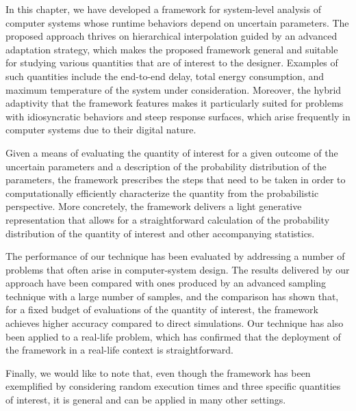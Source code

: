 In this chapter, we have developed a framework for system-level analysis of
computer systems whose runtime behaviors depend on uncertain parameters. The
proposed approach thrives on hierarchical interpolation guided by an advanced
adaptation strategy, which makes the proposed framework general and suitable for
studying various quantities that are of interest to the designer. Examples of
such quantities include the end-to-end delay, total energy consumption, and
maximum temperature of the system under consideration. Moreover, the hybrid
adaptivity that the framework features makes it particularly suited for problems
with idiosyncratic behaviors and steep response surfaces, which arise frequently
in computer systems due to their digital nature.

Given a means of evaluating the quantity of interest for a given outcome of the
uncertain parameters and a description of the probability distribution of the
parameters, the framework prescribes the steps that need to be taken in order to
computationally efficiently characterize the quantity from the probabilistic
perspective. More concretely, the framework delivers a light generative
representation that allows for a straightforward calculation of the probability
distribution of the quantity of interest and other accompanying statistics.

The performance of our technique has been evaluated by addressing a number of
problems that often arise in computer-system design. The results delivered by
our approach have been compared with ones produced by an advanced sampling
technique with a large number of samples, and the comparison has shown that, for
a fixed budget of evaluations of the quantity of interest, the framework
achieves higher accuracy compared to direct simulations. Our technique has also
been applied to a real-life problem, which has confirmed that the deployment of
the framework in a real-life context is straightforward.

Finally, we would like to note that, even though the framework has been
exemplified by considering random execution times and three specific quantities
of interest, it is general and can be applied in many other settings.
